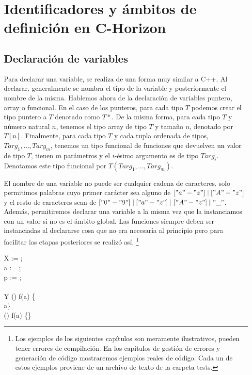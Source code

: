 \chapter{Identificadores y ámbitos de definición en C-Horizon}
\label{cap:identificadores}




\section{Declaración de variables}
Para declarar una variable, se realiza de una forma muy similar a C++.
Al declarar, generalmente se nombra el tipo de la variable y posteriormente el nombre de la misma. Hablemos ahora de la declaración de variables puntero, array o funcional. En el caso de los punteros, para cada tipo $T$ podemos crear el tipo puntero a $T$ denotado como $T*$. De la misma forma, para cada  tipo $T$ y número natural $n$, tenemos el tipo array de tipo $T$ y tamaño $n$, denotado por 
$T[n]$. Finalmente, para cada  tipo $T$ y cada tupla ordenada  de tipos, $Targ_{1},\dots,Targ_{m}$, tenemos un tipo funcional de funciones que devuelven un valor de tipo  $T$, tienen $m$ parámetros y el $i$-ésimo argumento es de tipo 
$Targ_{i}$. Denotamos este tipo funcional por 
$T(Targ_{1},\dots,Targ_{m})$.
  
El nombre de una variable no puede ser cualquier cadena de caracteres, solo permitimos palabras cuyo primer carácter sea alguno de 
$["a"-"z"] \mid ["A"-"z"]$ 
y el resto de caracteres sean de
$["0"-"9"] \mid  ["a"-"z"] \mid  ["A"-"z"] \mid  "\_"$. \\
Además, permitiremos declarar una variable a la misma vez que la instanciamos con un valor si no es el \'{a}mbito global. Las funciones siempre deben ser instanciadas al declararse cosa que no era necesar\'{i}a al principio pero para facilitar las etapas posteriores se realiz\'{o} as\'{i}. \footnote{Los ejemplos de los siguientes capítulos son meramente ilustrativos, pueden tener errores
de compilación. En los capítulos de gestión de errores y generación de código mostraremos ejemplos reales de código.
Cada un de estos ejemplos proviene de un archivo de texto de la carpeta tests.}
\begin{algorithm}
	\Integer{} X  := ;\\
	\Boolean{} a  := ;\\	
	\Integer{*} p  := ;\\	
	\\	
 	\Boolean{[\const{3}]} Y  \;
	\Integer{}(\Integer{}) f(a) \{	\\ \quad\Returnn{} a\;\}\;
    \\	
    \Void{}(\Integer{}) f(a) \{\}\;
	
\end{algorithm}
\newpage

